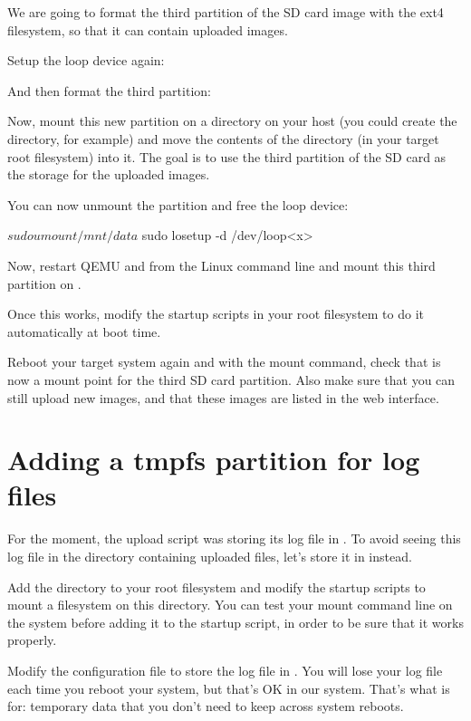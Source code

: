 We are going to format the third partition of the SD card image
with the ext4 filesystem, so that it can contain uploaded images.

Setup the loop device again:

And then format the third partition:


Now, mount this new partition on a directory on your host (you could
create the  directory, for example) and move the contents of the
 directory (in your target root filesystem) into
it. The goal is to use the third partition of the SD card as the storage
for the uploaded images.

You can now unmount the partition and free the loop device:
\begin{bashinput}
$ sudo umount /mnt/data
$ sudo losetup -d /dev/loop<x>
\end{bashinput}

Now, restart QEMU and from the Linux command line and
mount this third partition on .

Once this works, modify the startup scripts in your root filesystem
to do it automatically at boot time.

Reboot your target system again and with the mount command, check that
 is now a mount point for the third SD card
partition. Also make sure that you can still upload new images, and
that these images are listed in the web interface.

\section{Adding a tmpfs partition for log files}

For the moment, the upload script was storing its log file in
. To avoid seeing this log file in
the directory containing uploaded files, let's store it in
 instead.

Add the  directory to your root filesystem and modify
the startup scripts to mount a  filesystem on this
directory. You can test your  mount command line on the
system before adding it to the startup script, in order to be sure
that it works properly.

Modify the  configuration file to store
the log file in . You will lose your log
file each time you reboot your system, but that's OK in our
system. That's what  is for: temporary data that you don't need
to keep across system reboots.

